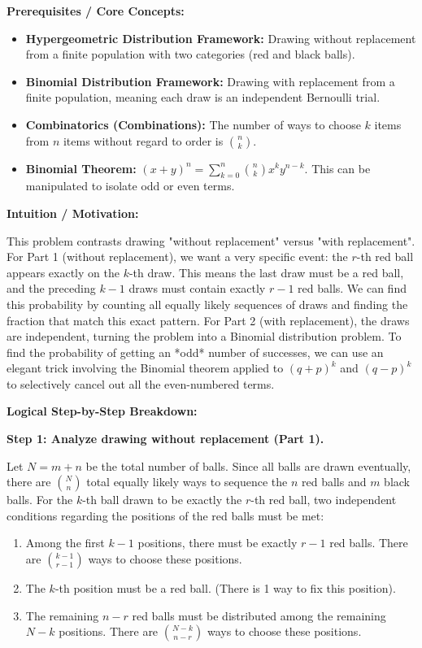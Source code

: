 \begin{solution}
\textbf{Prerequisites / Core Concepts:}
\begin{itemize}
    \item \textbf{Hypergeometric Distribution Framework:} Drawing without replacement from a finite population with two categories (red and black balls).
    \item \textbf{Binomial Distribution Framework:} Drawing with replacement from a finite population, meaning each draw is an independent Bernoulli trial.
    \item \textbf{Combinatorics (Combinations):} The number of ways to choose $k$ items from $n$ items without regard to order is $\binom{n}{k}$.
    \item \textbf{Binomial Theorem:} $(x+y)^n = \sum_{k=0}^n \binom{n}{k} x^k y^{n-k}$. This can be manipulated to isolate odd or even terms.
\end{itemize}

\textbf{Intuition / Motivation:}

This problem contrasts drawing "without replacement" versus "with replacement". 
For Part 1 (without replacement), we want a very specific event: the $r$-th red ball appears exactly on the $k$-th draw. This means the last draw must be a red ball, and the preceding $k-1$ draws must contain exactly $r-1$ red balls. We can find this probability by counting all equally likely sequences of draws and finding the fraction that match this exact pattern.
For Part 2 (with replacement), the draws are independent, turning the problem into a Binomial distribution problem. To find the probability of getting an *odd* number of successes, we can use an elegant trick involving the Binomial theorem applied to $(q+p)^k$ and $(q-p)^k$ to selectively cancel out all the even-numbered terms.

\textbf{Logical Step-by-Step Breakdown:}

\textbf{Step 1: Analyze drawing without replacement (Part 1).}

Let $N = m+n$ be the total number of balls. Since all balls are drawn eventually, there are $\binom{N}{n}$ total equally likely ways to sequence the $n$ red balls and $m$ black balls.
For the $k$-th ball drawn to be exactly the $r$-th red ball, two independent conditions regarding the positions of the red balls must be met:
\begin{enumerate}
    \item Among the first $k-1$ positions, there must be exactly $r-1$ red balls. There are $\binom{k-1}{r-1}$ ways to choose these positions.
    \item The $k$-th position must be a red ball. (There is 1 way to fix this position).
    \item The remaining $n-r$ red balls must be distributed among the remaining $N-k$ positions. There are $\binom{N-k}{n-r}$ ways to choose these positions.
\end{enumerate}


\end{solution}
